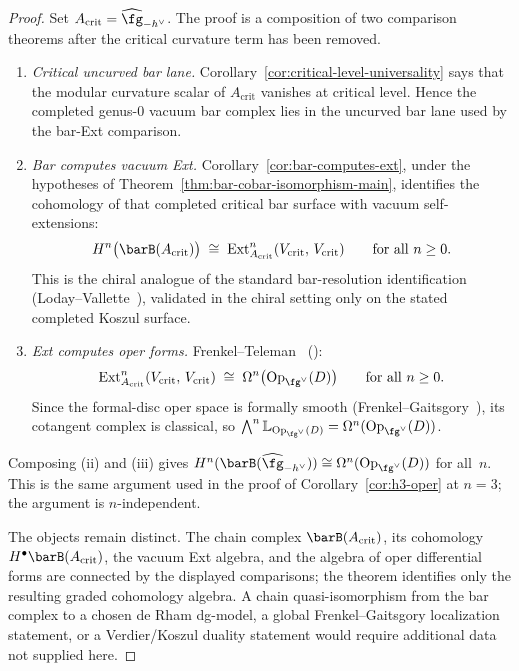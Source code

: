 \begin{proof}
Set $A_{\mathrm{crit}}=\widehat{\fg}_{-h^\vee}$.
The proof is a composition of two comparison theorems after the
critical curvature term has been removed.
\begin{enumerate}[label=\textup{(\roman*)}]
\item \emph{Critical uncurved bar lane.}\quad
 Corollary~\ref{cor:critical-level-universality} says that the modular
 curvature scalar of $A_{\mathrm{crit}}$ vanishes at critical level.
 Hence the completed genus-$0$ vacuum bar complex lies in the
 uncurved bar lane used by the bar-Ext comparison.
\item \emph{Bar computes vacuum Ext.}\quad
 Corollary~\ref{cor:bar-computes-ext}, under the hypotheses of
 Theorem~\ref{thm:bar-cobar-isomorphism-main}, identifies the
 cohomology of that completed critical bar surface with vacuum
 self-extensions:
 \[
 H^n\bigl(\barB(A_{\mathrm{crit}})\bigr)
 \;\cong\;
 \mathrm{Ext}^n_{A_{\mathrm{crit}}}
 (V_{\mathrm{crit}},\, V_{\mathrm{crit}})
 \qquad \text{for all } n \geq 0.
 \]
 This is the chiral analogue of the standard bar-resolution
 identification (Loday--Vallette~\cite{LV12}), validated in the
 chiral setting only on the stated completed Koszul surface.
\item \emph{Ext computes oper forms.}\quad
 Frenkel--Teleman~\cite{FT06} (\ClaimStatusProvedElsewhere):
 \[
 \mathrm{Ext}^n_{A_{\mathrm{crit}}}
 (V_{\mathrm{crit}},\, V_{\mathrm{crit}})
 \;\cong\;
 \Omega^n\bigl(\mathrm{Op}_{\fg^\vee}(D)\bigr)
 \qquad \text{for all } n \geq 0.
 \]
 Since the formal-disc oper space is formally smooth
 (Frenkel--Gaitsgory~\cite{FG06}), its cotangent complex is classical,
 so $\bigwedge^n\mathbb L_{\mathrm{Op}_{\fg^\vee}(D)}
 =\Omega^n(\mathrm{Op}_{\fg^\vee}(D))$.
\end{enumerate}
Composing (ii) and (iii) gives
$H^n(\barB(\widehat{\fg}_{-h^\vee}))
\cong \Omega^n(\mathrm{Op}_{\fg^\vee}(D))$ for all~$n$.
This is the same argument used in the proof of
Corollary~\ref{cor:h3-oper} at $n = 3$; the argument is
$n$-independent.

The objects remain distinct. The chain complex
$\barB(A_{\mathrm{crit}})$, its cohomology
$H^\bullet\barB(A_{\mathrm{crit}})$, the vacuum Ext algebra, and the
algebra of oper differential forms are connected by the displayed
comparisons; the theorem identifies only the resulting graded
cohomology algebra. A chain quasi-isomorphism from the bar complex to
a chosen de Rham dg-model, a global Frenkel--Gaitsgory localization
statement, or a Verdier/Koszul duality statement would require
additional data not supplied here.
\end{proof}


